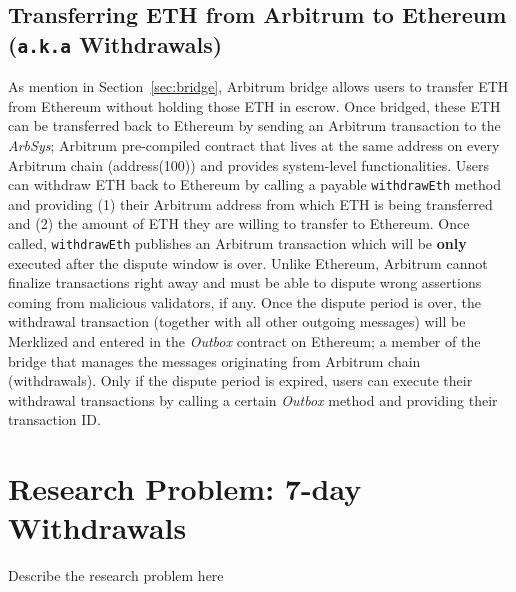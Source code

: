 \subsection{Transferring ETH from Arbitrum to Ethereum (\texttt{a.k.a} Withdrawals)}

As mention in Section~\ref{sec:bridge}, Arbitrum bridge allows users to transfer ETH from Ethereum without holding those ETH in escrow. Once bridged, these ETH can be transferred back to Ethereum by sending an Arbitrum transaction to the \textit{ArbSys}; Arbitrum pre-compiled contract that lives at the same address on every Arbitrum chain (address(100)) and provides system-level functionalities. Users can withdraw ETH back to Ethereum by calling a payable \texttt{withdrawEth} method and providing (1) their Arbitrum address from which ETH is being transferred and (2) the amount of ETH they are willing to transfer to Ethereum. Once called, \texttt{withdrawEth} publishes an Arbitrum transaction which will be \textbf{only} executed after the dispute window is over. Unlike Ethereum, Arbitrum cannot finalize transactions right away and must be able to dispute wrong assertions coming from malicious validators, if any. Once the dispute period is over, the withdrawal transaction (together with all other outgoing messages) will be Merklized and entered in the \textit{Outbox} contract on Ethereum; a member of the bridge that manages the messages originating from Arbitrum chain (\eg withdrawals). Only if the dispute period is expired, users can execute their withdrawal transactions by calling a certain \textit{Outbox} method and providing their transaction ID.





































\section{Research Problem: 7-day Withdrawals}
	Describe the research problem here 


